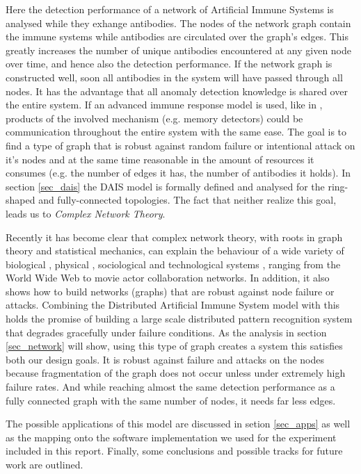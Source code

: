 \documentclass{article}
\begin{document}
Here the detection performance of a network of Artificial Immune Systems is analysed while they exhange antibodies.
The nodes of the network graph contain the immune systems while antibodies are circulated over the graph's edges.
This greatly increases the number of unique antibodies encountered at any given node over time, and hence also the detection performance.
If the network graph is constructed well, soon all antibodies in the system will have passed through all nodes.
It has the advantage that all anomaly detection knowledge is shared over the entire system.
If an advanced immune response model is used, like in \cite{hofmeyr_phd}, products of the involved mechanism (e.g. memory detectors) could be communication throughout the entire system with the same ease.
The goal is to find a type of graph that is robust against random failure or intentional attack on it's nodes and at the same time reasonable in the amount of resources it consumes (e.g. the number of edges it has, the number of antibodies it holds).
In section \ref{sec_dais} the DAIS model is formally defined and analysed for the ring-shaped and fully-connected topologies.
The fact that neither realize this goal, leads us to {\it Complex Network Theory}.

Recently it has become clear that complex network theory, with roots in graph theory and statistical mechanics, can explain the behaviour of a wide variety of biological \cite{epidemic}, physical \cite{bianconi}, sociological \cite{newman} and technological systems \cite{strogatz}, ranging from the World Wide Web \cite{barabasi_network} to movie actor collaboration networks. 
In addition, it also shows how to build networks (graphs) that are robust against node failure or attacks.
Combining the Distributed Artificial Immune System model with this holds the promise of building a large scale distributed pattern recognition system that degrades gracefully under failure conditions.
As the analysis in section \ref{sec_network} will show, using this type of graph creates a system this satisfies both our design goals.
It is robust against failure and attacks on the nodes because fragmentation of the graph does not occur unless under extremely high failure rates.
And while reaching almost the same detection performance as a fully connected graph with the same number of nodes, it needs far less edges.

The possible applications of this model are discussed in setion \ref{sec_apps} as well as the mapping onto the software implementation we used for the experiment included in this report.
Finally, some conclusions and possible tracks for future work are outlined.
\end{document}
